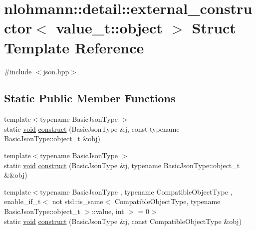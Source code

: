 \hypertarget{structnlohmann_1_1detail_1_1external__constructor_3_01value__t_1_1object_01_4}{}\section{nlohmann\+::detail\+::external\+\_\+constructor$<$ value\+\_\+t\+::object $>$ Struct Template Reference}
\label{structnlohmann_1_1detail_1_1external__constructor_3_01value__t_1_1object_01_4}


{\ttfamily \#include $<$json.\+hpp$>$}

\subsection*{Static Public Member Functions}
\begin{DoxyCompactItemize}
\item 
{\footnotesize template$<$typename Basic\+Json\+Type $>$ }\\static \mbox{\hyperlink{namespacenlohmann_1_1detail_a59fca69799f6b9e366710cb9043aa77d}{void}} \mbox{\hyperlink{structnlohmann_1_1detail_1_1external__constructor_3_01value__t_1_1object_01_4_a3a369c5d49596dd4411e368425f9ac7a}{construct}} (Basic\+Json\+Type \&j, const typename Basic\+Json\+Type\+::object\+\_\+t \&obj)
\item 
{\footnotesize template$<$typename Basic\+Json\+Type $>$ }\\static \mbox{\hyperlink{namespacenlohmann_1_1detail_a59fca69799f6b9e366710cb9043aa77d}{void}} \mbox{\hyperlink{structnlohmann_1_1detail_1_1external__constructor_3_01value__t_1_1object_01_4_a1e044961affbd6417386d6e9f1d545e9}{construct}} (Basic\+Json\+Type \&j, typename Basic\+Json\+Type\+::object\+\_\+t \&\&obj)
\item 
{\footnotesize template$<$typename Basic\+Json\+Type , typename Compatible\+Object\+Type , enable\+\_\+if\+\_\+t$<$ not std\+::is\+\_\+same$<$ Compatible\+Object\+Type, typename Basic\+Json\+Type\+::object\+\_\+t $>$\+::value, int $>$  = 0$>$ }\\static \mbox{\hyperlink{namespacenlohmann_1_1detail_a59fca69799f6b9e366710cb9043aa77d}{void}} \mbox{\hyperlink{structnlohmann_1_1detail_1_1external__constructor_3_01value__t_1_1object_01_4_a91f89abe0ec4dec59099b691682ff927}{construct}} (Basic\+Json\+Type \&j, const Compatible\+Object\+Type \&obj)
\end{DoxyCompactItemize}


